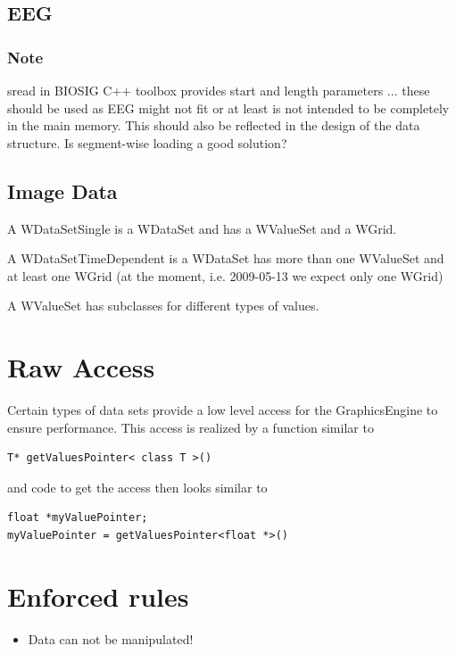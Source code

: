 \documentclass[a4paper,12pt]{scrbook}
\begin{document}
\subsection{EEG}
\subsubsection{Note}
sread in BIOSIG C++ toolbox provides start and length parameters ... these should be used as EEG might not fit or at least is not
intended to be completely in the main memory. This should also be reflected in the design of the data structure.  Is segment-wise
loading a good solution?

\subsection{Image Data}

A WDataSetSingle is a WDataSet and has a WValueSet and a WGrid.

A WDataSetTimeDependent is a WDataSet has more than one WValueSet and at least one WGrid (at the moment, i.e. 2009-05-13 we expect
only one WGrid)

A WValueSet has subclasses for different types of values.

\section{Raw Access}
Certain types of data sets provide a low level access for the GraphicsEngine to ensure performance. This access is realized by a
function similar to
\begin{verbatim}
T* getValuesPointer< class T >()
\end{verbatim}
and code to get the access then looks similar to
\begin{verbatim}
float *myValuePointer;
myValuePointer = getValuesPointer<float *>()
\end{verbatim}

\section{Enforced rules}
\begin{itemize}
\item Data can not be manipulated!
\end{itemize}


\end{document}
